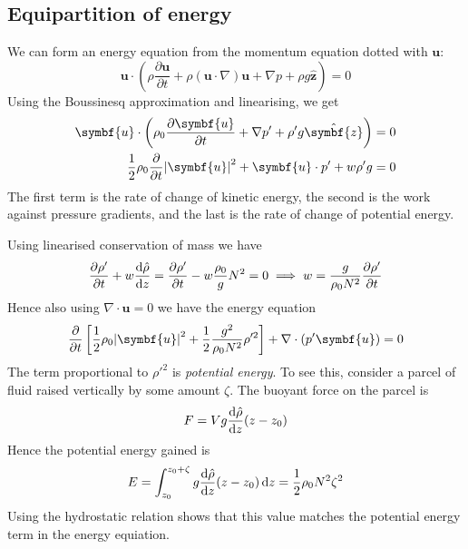 \documentclass{jknotes}
\begin{document}
\subsection{Equipartition of energy}
We can form an energy equation from the momentum equation dotted with
$\symbf{u}$:
\begin{equation}
	\symbf{u} \cdot \left( \rho \frac{\partial \symbf{u}}{\partial t} + \rho
	(\symbf{u}\cdot\nabla)\symbf{u} + \nabla p + \rho g \hat{\symbf{z}}\right)
	= 0
\end{equation}
Using the Boussinesq approximation and linearising, we get
\begin{align}
	\symbf{u} \cdot \left( \rho_0 \frac{\partial \symbf{u}}{\partial t} +
	\nabla p' + \rho' g \hat{\symbf{z}}\right) &= 0 \\
	\frac{1}{2}\rho_0 \frac{\partial}{\partial t} \abs{\symbf{u}}^2 +
	\symbf{u} \cdot p' + w \rho' g &= 0
\end{align}
The first term is the rate of change of kinetic energy, the second is the work
against pressure gradients, and the last is the rate of change of potential
energy.

Using linearised conservation of mass we have
\begin{equation}
	\frac{\partial \rho'}{\partial t} + w \frac{\diffd \hat{\rho}}{\diffd z} =
	\frac{\partial \rho'}{\partial t} - w \frac{\rho_0}{g} N^2 = 0 \implies w
	= \frac{g}{\rho_0 N^2} \frac{\partial \rho'}{\partial t}
\end{equation}
Hence also using $\nabla \cdot \symbf{u} = 0$ we have the energy equation
\begin{equation}
	\frac{\partial}{\partial t} \left[ \frac{1}{2}\rho_0 \abs{\symbf{u}}^2 +
	\frac{1}{2}\frac{g^2}{\rho_0 N^2} \rho'^2 \right] + \nabla \cdot (p'
	\symbf{u}) = 0
\end{equation}
The term proportional to $\rho'^2$ is \emph{potential energy}. To see this,
consider a parcel of fluid raised vertically by some amount $\zeta$. The
buoyant force on the parcel is
\begin{equation} 
	F = V g \frac{\diffd \hat{\rho}}{\diffd z} (z-z_0)
\end{equation}
Hence the potential energy gained is
\begin{equation}
	E = \int_{z_0}^{z_0 + \zeta} g \frac{\diffd \hat{\rho}}{\diffd z} (z-z_0)
	\, \diffd z = \frac{1}{2} \rho_0 N^2 \zeta^2
\end{equation}
Using the hydrostatic relation shows that this value matches the potential
energy term in the energy equiation.
\end{document}
